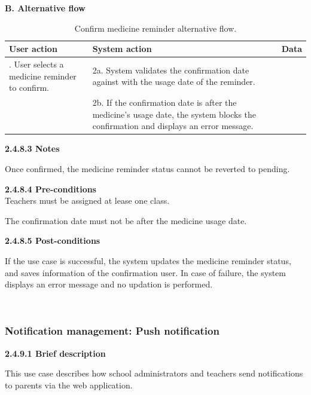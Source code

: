 \par\indent\indent\textbf{B. Alternative flow}
\vspace{-0.5em}
\renewcommand{\arraystretch}{1.5}
\begin{longtable}{|>{\raggedright\arraybackslash}p{4.5cm}|
                  >{\raggedright\arraybackslash}p{6cm}|
                  >{\raggedright\arraybackslash}p{4.5cm}|}                  
\caption{Confirm medicine reminder alternative flow.}
\label{tab:medicine_reminder_management_alternative_flow}\\
\hline
\centering\textbf{User action} & \centering\textbf{System action} & \centering\arraybackslash\textbf{Data} \\
\hline
\endfirsthead
\endhead
1. User selects a medicine reminder to confirm.&2a. System validates the confirmation date against with the usage date of the reminder.&\\
\hline
&2b. If the confirmation date is after the medicine's usage date, the system blocks the confirmation and displays an error message.&\\
\hline
\end{longtable}

\indent\textbf{2.4.8.3 Notes}
\par\indent\indent\parbox{0.9\textwidth}{
    Once confirmed, the medicine reminder status cannot be reverted to pending.
}
\vspace{0.5em}

\indent\textbf{2.4.8.4 Pre-conditions}\\
\indent\indent  Teachers must be assigned at lease one class.
\vspace{0.25em}
\par\indent\indent\parbox{0.9\textwidth}{
    The confirmation date must not be after the medicine usage date.
}
\vspace{0.5em}

\indent\textbf{2.4.8.5 Post-conditions}\\
\vspace{-0.7em}
\par\indent\indent\parbox{0.9\textwidth}{
    If the use case is successful, the system updates the medicine reminder status, and saves information of the confirmation user. In case of failure, the system displays an error message and no updation is performed.
}\\

\subsubsection{Notification management: Push notification}
\indent\indent\textbf{2.4.9.1 Brief description}
\vspace{0.5em}
\par\indent\indent\parbox{0.9\textwidth}{
    This use case describes how school administrators and teachers send notifications to parents via the web application.
}\\

